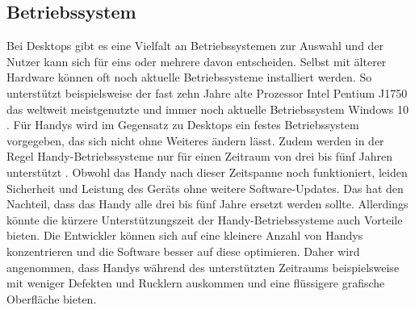 \subsection{Betriebssystem}
Bei Desktops gibt es eine Vielfalt an Betriebssystemen zur Auswahl und der Nutzer kann sich für eins oder mehrere davon entscheiden. %
	Selbst mit älterer Hardware können oft noch aktuelle Betriebssysteme installiert werden. So unterstützt beispielsweise der fast zehn Jahre alte Prozessor Intel Pentium J1750 das weltweit meistgenutzte und immer noch aktuelle Betriebssystem Windows 10 \cite{pcVsphone_intelWindowsSupport, pcVsphone_destkopOperatingSystem, pcVsphone_windowsVersions}.\newline%
Für Handys wird im Gegensatz zu Desktops ein festes Betriebssystem vorgegeben, das sich nicht ohne Weiteres ändern lässt. %
	Zudem werden in der Regel Handy-Betriebssysteme nur für einen Zeitraum von drei bis fünf Jahren unterstützt \cite{pcVsphone_deviceSupportGoogle, pcVsphone_deviceSupportApple}. %
		Obwohl das Handy nach dieser Zeitspanne noch funktioniert, leiden Sicherheit und Leistung des Geräts ohne weitere Software-Updates. Das hat den Nachteil, dass das Handy alle drei bis fünf Jahre ersetzt werden sollte.\newline%
		Allerdings könnte die kürzere Unterstützungszeit der Handy-Betriebssysteme auch Vorteile bieten. Die Entwickler können sich auf eine kleinere Anzahl von Handys konzentrieren und die Software besser auf diese optimieren. Daher wird angenommen, dass Handys während des unterstützten Zeitraums beispielsweise mit weniger Defekten und Rucklern auskommen und eine flüssigere grafische Oberfläche bieten.\newline%
%
%
%
%
%
%		
%	
%
